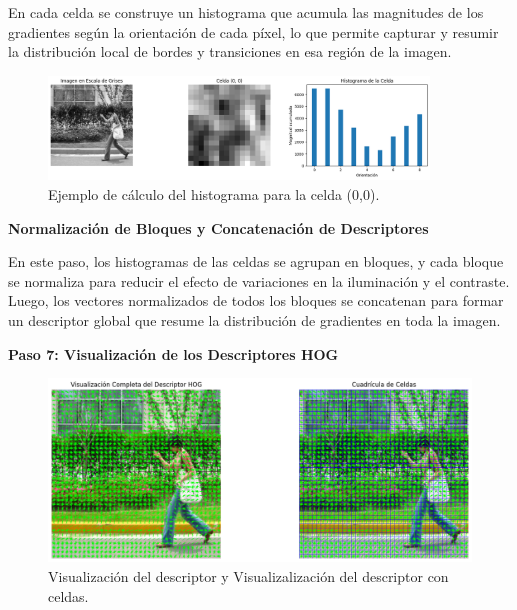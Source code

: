 \documentclass[a4paper]{article}
\begin{document}
En cada celda se construye un histograma que acumula las magnitudes de los gradientes según la orientación de cada píxel, lo que permite capturar y resumir la distribución local de bordes y transiciones en esa región de la imagen.

\begin{figure}[H]
    \centering
    \includegraphics[width=0.9\textwidth]{images/hog_paso_6.png}
    \caption{Ejemplo de cálculo del histograma para la celda (0,0).}
\end{figure}

\textbf{Normalización de Bloques y Concatenación de Descriptores}
\par\vspace{0.5cm}

En este paso, los histogramas de las celdas se agrupan en bloques, y cada bloque se normaliza para reducir el efecto de variaciones en la iluminación y el contraste. Luego, los vectores normalizados de todos los bloques se concatenan para formar un descriptor global que resume la distribución de gradientes en toda la imagen.
\par\vspace{0.5cm}

\textbf{Paso 7: Visualización de los Descriptores HOG}
\par\vspace{0.5cm}

\begin{figure}[H]
    \centering
    \includegraphics[width=1.0\textwidth]{images/hog_paso_7.png}
    \caption{Visualización del descriptor y Visualizalización del descriptor con celdas.}
\end{figure}
\end{document}
